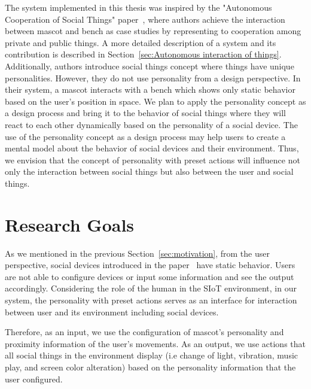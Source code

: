 The system implemented in this thesis was inspired by the "Autonomous Cooperation of Social Things"
paper~\cite{okada2016autonomous},
where authors achieve the interaction between mascot and bench as case
studies by representing to cooperation among private and public things.
A more detailed description of a system and its contribution is described
in Section~\ref{sec:Autonomous interaction of things}.
Additionally, authors introduce social things concept where things have unique personalities.
However, they do not use personality from a design perspective.
In their system, a mascot interacts with a bench which shows only static behavior based on the user's position in space.
We plan to apply the personality concept as a design process and bring it to the
behavior of social things where they will react to each other dynamically based on the personality of a social device.
The use of the personality concept as a design process may help users to
create a mental model about the behavior of social devices and their environment.
Thus, we envision that the concept of personality with preset actions will influence
not only the interaction between social things but also between the user and social things.

\section{Research Goals}
\label{sec:research-goals}
As we mentioned in the previous Section~\ref{sec:motivation}, from the user perspective, social devices introduced
in the paper~\cite{okada2016autonomous} have static behavior.
Users are not able to configure devices or input some information and see the output accordingly.
Considering the role of the human in the SIoT environment, in our system, the personality with preset
actions serves as an interface for interaction between user and its environment including social devices.

Therefore, as an input, we use the configuration of mascot's personality and proximity
information of the user's movements.
As an output, we use actions that all social things in the environment display
(i.e change of light, vibration, music play, and screen color alteration) based
on the personality information that the user configured.

